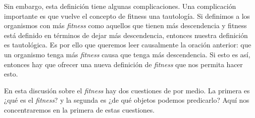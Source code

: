 Sin embargo, esta definición tiene algunas complicaciones. Una complicación importante es que vuelve el concepto de fitness una tautología. Si definimos a los organismos con más \emph{fitness} como aquellos que tienen más descendencia y fitness está definido en términos de dejar más descendencia, entonces nuestra definición es tautológica. Es por ello que queremos leer causalmente la oración anterior: que un organismo tenga más \emph{fitness} causa que tenga más descendencia. Si esto es así, entonces hay que ofrecer una nueva definición de \emph{fitness} que nos permita hacer esto.

En esta discusión sobre el \emph{fitness} hay dos cuestiones de por medio. La primera es ¿qué es el \emph{fitness}? y la segunda es ¿de qué objetos podemos predicarlo? Aquí nos concentraremos en la primera de estas cuestiones.

